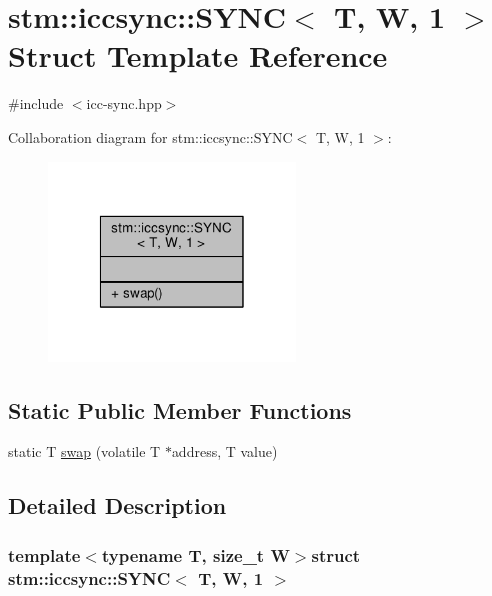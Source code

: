\hypertarget{structstm_1_1iccsync_1_1SYNC_3_01T_00_01W_00_011_01_4}{\section{stm\-:\-:iccsync\-:\-:S\-Y\-N\-C$<$ T, W, 1 $>$ Struct Template Reference}
\label{structstm_1_1iccsync_1_1SYNC_3_01T_00_01W_00_011_01_4}
}


{\ttfamily \#include $<$icc-\/sync.\-hpp$>$}



Collaboration diagram for stm\-:\-:iccsync\-:\-:S\-Y\-N\-C$<$ T, W, 1 $>$\-:
\nopagebreak
\begin{figure}[H]
\begin{center}
\leavevmode
\includegraphics[width=186pt]{structstm_1_1iccsync_1_1SYNC_3_01T_00_01W_00_011_01_4__coll__graph}
\end{center}
\end{figure}
\subsection*{Static Public Member Functions}
\begin{DoxyCompactItemize}
\item 
static T \hyperlink{structstm_1_1iccsync_1_1SYNC_3_01T_00_01W_00_011_01_4_aa0ee6e0375dce8d4bf6949ada79094d6}{swap} (volatile T $\ast$address, T value)
\end{DoxyCompactItemize}


\subsection{Detailed Description}
\subsubsection*{template$<$typename T, size\-\_\-t W$>$struct stm\-::iccsync\-::\-S\-Y\-N\-C$<$ T, W, 1 $>$}

